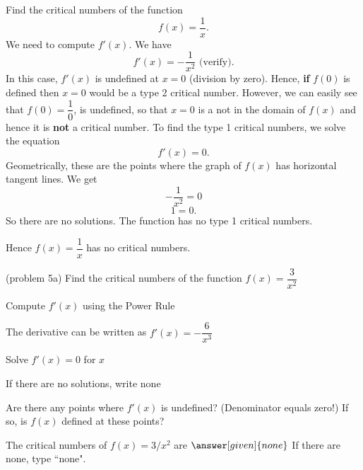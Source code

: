 \documentclass{ximera}
\begin{document}
\begin{example}[example 5]  Find the critical numbers of the function 
\[f(x) = \dfrac{1}{x}.\]
We need to compute $f'(x)$.  We have
\[f'(x) = -\frac{1}{ x^2} \mbox{   (verify)}.\]
In this case, $f'(x)$ is undefined at $x = 0$ (division by zero). Hence,  {\bf if}
$f(0)$ is defined then $x=0$ would be a type 2 critical number.  However, we can easily see that $f(0) = \dfrac{1}{0}$, is undefined,  so 
that $x=0$ is a not in the domain of $f(x)$ and hence it is {\bf not} a critical number.
To find the type 1 critical numbers, we solve the equation
\[f'(x) = 0.\]
Geometrically, these are the points where the graph of $f(x)$ has horizontal tangent lines.
We get
\[ -\frac{1}{ x^2}  =0\]
\[ 1 =0.\]
So there are no solutions.  The function has no type 1 critical numbers.


Hence $f(x) = \dfrac{1}{x}$ has no critical numbers. 
\end{example}


\begin{problem}(problem 5a)
  Find the critical numbers of the function $f(x) = \dfrac{3}{x^2}$
  
  
    \begin{hint}
      Compute $f'(x)$ using the Power Rule
    \end{hint}
    \begin{hint}
      The derivative can be written as $f'(x) = -\dfrac{6}{x^3}$
    \end{hint}
		\begin{hint}
      Solve $f'(x) = 0$ for $x$
    \end{hint}
		\begin{hint}
      If there are no solutions, write none
    \end{hint}
    \begin{hint}
      Are there any points where $f'(x)$ is undefined? (Denominator equals zero!)
      If so, is $f(x)$ defined at these points?  
		\end{hint}
    
    
		The critical numbers of $f(x) = 3/x^2$ are
		 $\answer[given]{none}$
		If there are none, type ``none".
\end{problem}
\end{document}
